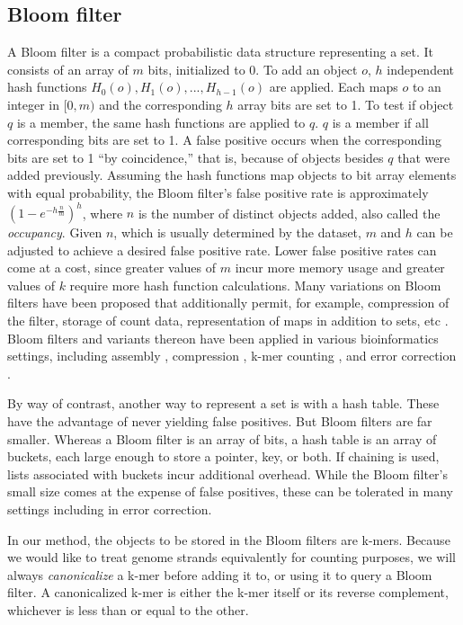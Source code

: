 \documentclass[10pt]{article}
\begin{document}
\subsection*{Bloom filter}
A Bloom filter \cite{bloom1970space} is a compact probabilistic data structure representing a set.  It consists of an array of $m$ bits, initialized to 0.  To add an object $o$, $h$ independent hash functions $H_0(o), H_1(o),...,H_{h-1}(o)$ are applied.  Each maps $o$ to an integer in $[0, m)$ and the corresponding $h$ array bits are set to 1. To test if object $q$ is a member, the same hash functions are applied to $q$.  $q$ is a member if all corresponding bits are set to 1.  A false positive occurs when the corresponding bits are set to 1 ``by coincidence,'' that is, because of objects besides $q$ that were added previously.  Assuming the hash functions map objects to bit array elements with equal probability, the Bloom filter's false positive rate is approximately $(1-e^{-h\frac{n}{m}})^h$, where $n$ is the number of distinct objects added, also called the \emph{occupancy}.  Given $n$, which is usually determined by the dataset, $m$ and $h$ can be adjusted to achieve a desired false positive rate.  Lower false positive rates can come at a cost, since greater values of $m$ incur more memory usage and greater values of $k$ require more hash function calculations.  Many variations on Bloom filters have been proposed that additionally permit, for example, compression of the filter, storage of count data, representation of maps in addition to sets, etc \cite{tarkoma2012theory}.  Bloom filters and variants thereon have been applied in various bioinformatics settings, including assembly \cite{pell2012scaling}, compression \cite{jones2012compression}, k-mer counting \cite{melsted2011efficient}, and error correction \cite{shi2010parallel}.

By way of contrast, another way to represent a set is with a hash table.  These have the advantage of never yielding false positives.  But Bloom filters are far smaller.  Whereas a Bloom filter is an array of bits, a hash table is an array of buckets, each large enough to store a pointer, key, or both.  If chaining is used, lists associated with buckets incur additional overhead.  While the Bloom filter's small size comes at the expense of false positives, these can be tolerated in many settings including in error correction.

In our method, the objects to be stored in the Bloom filters are k-mers.  Because we would like to treat genome strands equivalently for counting purposes, we will always \emph{canonicalize} a k-mer before adding it to, or using it to query a Bloom filter.  A canonicalized k-mer is either the k-mer itself or its reverse complement, whichever is less than or equal to the other.
\end{document}
